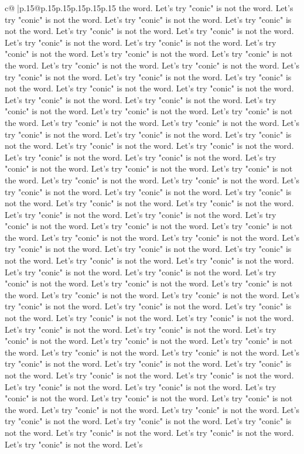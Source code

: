 \documentclass{article}
\begin{document}
{\begin{supertabular}{c@{$\;$}|p{.15\linewidth}@{}p{.15\linewidth}p{.15\linewidth}p{.15\linewidth}p{.15\linewidth}p{.15\linewidth}}
{{{the word. Let's try "conic" is not the word. Let's try "conic" is not the word. Let's try "conic" is not the word. Let's try "conic" is not the word. Let's try "conic" is not the word. Let's try "conic" is not the word. Let's try "conic" is not the word. Let's try "conic" is not the word. Let's try "conic" is not the word. Let's try "conic" is not the word. Let's try "conic" is not the word. Let's try "conic" is not the word. Let's try "conic" is not the word. Let's try "conic" is not the word. Let's try "conic" is not the word. Let's try "conic" is not the word. Let's try "conic" is not the word. Let's try "conic" is not the word. Let's try "conic" is not the word. Let's try "conic" is not the word. Let's try "conic" is not the word. Let's try "conic" is not the word. Let's try "conic" is not the word. Let's try "conic" is not the word. Let's try "conic" is not the word. Let's try "conic" is not the word. Let's try "conic" is not the word. Let's try "conic" is not the word. Let's try "conic" is not the word. Let's try "conic" is not the word. Let's try "conic" is not the word. Let's try "conic" is not the word. Let's try "conic" is not the word. Let's try "conic" is not the word. Let's try "conic" is not the word. Let's try "conic" is not the word. Let's try "conic" is not the word. Let's try "conic" is not the word. Let's try "conic" is not the word. Let's try "conic" is not the word. Let's try "conic" is not the word. Let's try "conic" is not the word. Let's try "conic" is not the word. Let's try "conic" is not the word. Let's try "conic" is not the word. Let's try "conic" is not the word. Let's try "conic" is not the word. Let's try "conic" is not the word. Let's try "conic" is not the word. Let's try "conic" is not the word. Let's try "conic" is not the word. Let's try "conic" is not the word. Let's try "conic" is not the word. Let's try "conic" is not the word. Let's try "conic" is not the word. Let's try "conic" is not the word. Let's try "conic" is not the word. Let's try "conic" is not the word. Let's try "conic" is not the word. Let's try "conic" is not the word. Let's try "conic" is not the word. Let's try "conic" is not the word. Let's try "conic" is not the word. Let's try "conic" is not the word. Let's try "conic" is not the word. Let's try "conic" is not the word. Let's try "conic" is not the word. Let's try "conic" is not the word. Let's try "conic" is not the word. Let's try "conic" is not the word. Let's try "conic" is not the word. Let's try "conic" is not the word. Let's try "conic" is not the word. Let's try "conic" is not the word. Let's try "conic" is not the word. Let's try "conic" is not the word. Let's try "conic" is not the word. Let's try "conic" is not the word. Let's try "conic" is not the word. Let's try "conic" is not the word. Let's try "conic" is not the word. Let's try "conic" is not the word. Let's try "conic" is not the word. Let's try "conic" is not the word. Let's try "conic" is not the word. Let's try "conic" is not the word. Let's try "conic" is not the word. Let's try "conic" is not the word. Let's try "conic" is not the word. Let's try "conic" is not the word. Let's try "conic" is not the word. Let's }}}
\end{supertabular}}
\end{document}
